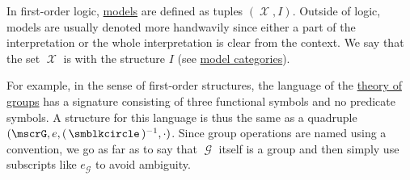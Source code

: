 \begin{remark}\label{rem:first_order_model_notation}
  In first-order logic, \hyperref[def:first_order_semantics/satisfiability]{models} are defined as tuples \( (\mscrX, I) \). Outside of logic, models are usually denoted more handwavily since either a part of the interpretation or the whole interpretation is clear from the context. We say that the set \( \mscrX \) is  with the structure \( I \) (see \hyperref[def:first_order_model_category]{model categories}).

  For example, in the sense of first-order structures, the language of the \hyperref[def:group/theory]{theory of groups} has a signature consisting of three functional symbols and no predicate symbols. A structure for this language is thus the same as a quadruple \( (\mscrG, e, (\placeholder)^{-1}, \cdot) \). Since group operations are named using a convention, we go as far as to say that \( \mscrG \) itself is a group and then simply use subscripts like \( e_{\mscrG} \) to avoid ambiguity.
\end{remark}

